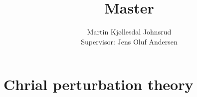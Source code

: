 \documentclass{book}
\title{\huge{Master}}
\author{
    \large{Martin Kjøllesdal Johnsrud}\\
    \normalsize{Supervisor: Jens Oluf Andersen}
    }
\begin{document}
    \maketitle
    \listoftodos
    \clearpage
    \tableofcontents
   
    \setlength{\parindent}{0em}
    \setlength{\parskip}{0.8em}






    \chapter{Chrial perturbation theory}
    \label{chapter: chpt}
    
    
    
    
    

\end{document}
